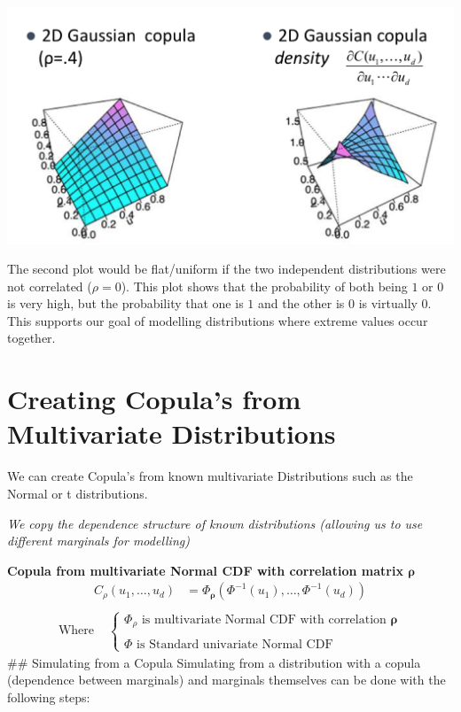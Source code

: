 \documentclass[
  oneside]{book}
\begin{document}
\includegraphics{Notes/Obsidian-Attachments/4-Multivariate-Return-Modelling-2.png}

The second plot would be flat/uniform if the two independent distributions were not correlated (\(\rho=0\)). This plot shows that the probability of both being \(1\) or \(0\) is very high, but the probability that one is \(1\) and the other is \(0\) is virtually 0. This supports our goal of modelling distributions where extreme values occur together.

\hypertarget{creating-copulas-from-multivariate-distributions}{%
\section{Creating Copula's from Multivariate Distributions}\label{creating-copulas-from-multivariate-distributions}}

We can create Copula's from known multivariate Distributions such as the Normal or t distributions.

\emph{We copy the dependence structure of known distributions (allowing us to use different marginals for modelling)}

\textbf{Copula from multivariate Normal CDF with correlation matrix \(\boldsymbol{\rho}\)}
\[
\begin{aligned}
C_{\rho}(u_{1},\dots ,u_{d}) &= \Phi_{\boldsymbol{\rho}}(\Phi ^{-1}(u_{1}), \dots, \Phi ^{-1}(u_{d}))\\
\end{aligned}
\]
\[
\begin{aligned}
\text{Where } & \begin{cases}
\Phi_{\rho} \text{ is multivariate Normal CDF with correlation } \boldsymbol{\rho} \\ \\
\Phi \text{ is Standard univariate Normal CDF}
\end{cases}
\end{aligned}
\]
\#\# Simulating from a Copula
Simulating from a distribution with a copula (dependence between marginals) and marginals themselves can be done with the following steps:
\end{document}

